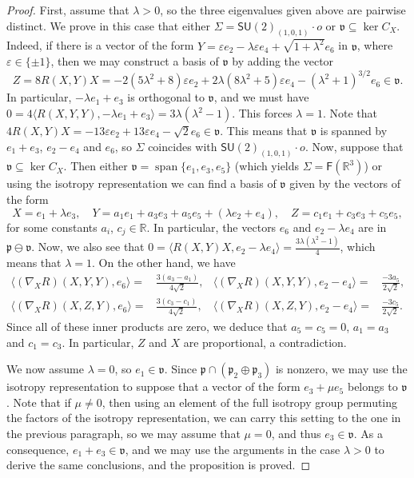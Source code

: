 \documentclass[11pt,a4paper,final]{amsart}
\newcommand{\g}{\mathfrak}
\newcommand{\R}{\mathbb{R}}
\newcommand{\vecspan}{\operatorname{span}}
\theoremstyle{definition}
\begin{document}
\begin{proof}
	First, assume that $\lambda > 0$, so the three eigenvalues given above are pairwise distinct.
	We prove in this case that either $\Sigma=\mathsf{SU}(2)_{(1,0,1)}\cdot o$ or $\g{v}\subseteq\ker C_{X}$.
	Indeed, if there is a vector of the form $Y=\varepsilon e_{2}-\lambda \varepsilon e_{4}+\sqrt{1+\lambda^{2}}e_{6}$ in $\g{v}$, where $\varepsilon\in\{\pm 1\}$, then we may construct a basis of $\g{v}$ by adding the vector
	\begin{equation*}
		Z=8 R(X,Y)X=-2 \left(5 \lambda ^2+8\right) \varepsilon e_{2}+2 \lambda 
		\left(8 \lambda ^2+5\right) \varepsilon e_{4}-\left(\lambda
		^2+1\right)^{3/2}e_{6}\in \g{v}.
	\end{equation*}
	In particular, $-\lambda e_{1}+e_{3}$ is orthogonal to $\g{v}$, and we must have $0=4\langle R(X,Y,Y),-\lambda e_{1}+e_{3} \rangle=3\lambda(\lambda^{2}-1)$.
	This forces $\lambda = 1$.
	Note that $4R(X,Y)X=-13\varepsilon e_{2}+13 \varepsilon e_{4}-\sqrt{2}e_{6}\in \g{v}$.
	This means that $\g{v}$ is spanned by $e_{1}+e_{3}$, $e_{2}-e_{4}$ and $e_{6}$, so $\Sigma$ coincides with $\mathsf{SU}(2)_{(1,0,1)}\cdot o$.
	Now, suppose that $\g{v}\subseteq \ker C_{X}$.
	Then either $\g{v}=\vecspan\{e_{1},e_{3},e_{5}\}$ (which yields $\Sigma=\mathsf{F}(\R^{3})$) or using the isotropy representation we can find a basis of $\g{v}$ given by the vectors of the form
	\[
		X={}e_{1}+\lambda e_{3}, \quad
		Y={}a_{1}e_{1}+a_{3}e_{3}+a_{5}e_{5}+(\lambda e_{2}+e_{4}), \quad
		Z={}c_{1}e_{1}+c_{3}e_{3}+c_{5}e_{5},
	\]
	for some constants $a_{i}$, $c_{j}\in\R$.
	In particular, the vectors $e_{6}$ and $e_{2}-\lambda e_{4}$ are in $\g{p}\ominus\g{v}$.
	Now, we also see that $0=\langle R(X,Y)X,e_{2}-\lambda e_{4}\rangle=\frac{3\lambda(\lambda^{2}-1)}{4}$, which means that $\lambda = 1$.
	On the other hand, we have
	\begin{align*}
		\langle (\nabla_{X}R)(X,Y,Y),e_{6} \rangle={}&\frac{3(a_{3}-a_{1})}{4\sqrt{2}},&
		\langle (\nabla_{X}R)(X,Y,Y),e_{2}-e_{4} \rangle={}&\frac{-3 a_{5}}{2\sqrt{2}}, \\
		\langle (\nabla_{X}R)(X,Z,Y),e_{6} \rangle={}&\frac{3(c_{3}-c_{1})}{4\sqrt{2}},&
		\langle (\nabla_{X}R)(X,Z,Y),e_{2}-e_{4} \rangle={}&\frac{-3 c_{5}}{2\sqrt{2}}.
		\end{align*}
	Since all of these inner products are zero, we deduce that $a_{5}=c_{5}=0$, $a_{1}=a_{3}$ and $c_{1}=c_{3}$.
	In particular, $Z$ and $X$ are proportional, a contradiction.
		
	We now assume $\lambda = 0$, so $e_{1}\in \g{v}$.
	Since $\g{p}\cap(\g{p}_{2}\oplus\g{p}_{3})$ is nonzero, we may use the isotropy representation to suppose that a vector of the form $e_{3}+\mu e_{5}$ belongs to $\g{v}$.
	Note that if $\mu \neq 0$, then using an element of the full isotropy group permuting the factors of the isotropy representation, we can carry this setting to the one in the previous paragraph, so we may assume that $\mu = 0$, and thus $e_{3}\in \g{v}$.
	As a consequence, $e_{1}+e_{3}\in \g{v}$, and we may use the arguments in the case $\lambda > 0$ to derive the same conclusions, and the proposition is proved. \qedhere
\end{proof}
\end{document}
